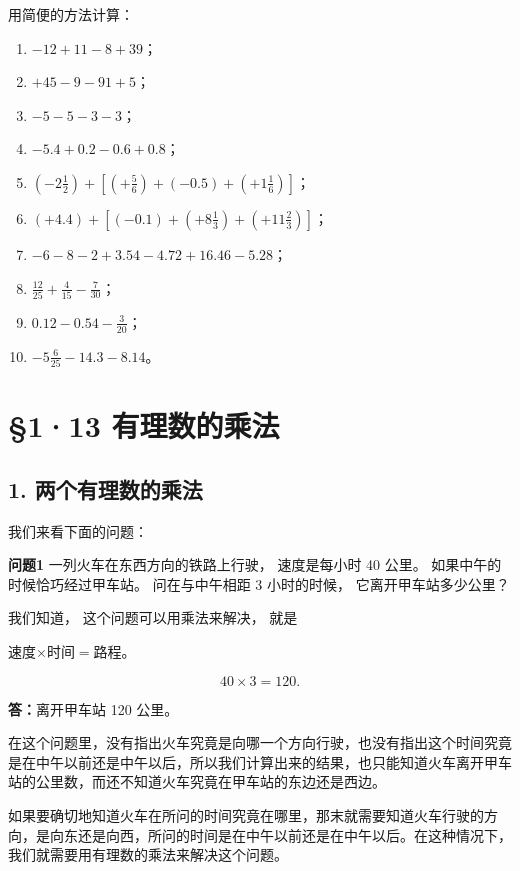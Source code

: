 用简便的方法计算：

\begin{enumerate}
\item \(-12 + 11 - 8 + 39\)；
\item \(+45 - 9 - 91 + 5\)；
\item \(-5 - 5 - 3 - 3\)；
\item \(-5.4 + 0.2 - 0.6 + 0.8\)；
\item \(\left(-2\frac{1}{2}\right) + \left[\left(+\frac{5}{6}\right) + (-0.5) + \left(+1\frac{1}{6}\right)\right]\)；
\item \((+4.4) + \left[(-0.1) + \left(+8\frac{1}{3}\right) + \left(+11\frac{2}{3}\right)\right]\)；
\item \(-6 - 8 - 2 + 3.54 - 4.72 + 16.46 - 5.28\)；
\item \(\frac{12}{25} + \frac{4}{15} - \frac{7}{30}\)；
\item \(0.12 - 0.54 - \frac{3}{20}\)；
\item \(-5\frac{6}{25} - 14.3 - 8.14\)。
\end{enumerate}

\section{§1·13 有理数的乘法}

\subsection{1. 两个有理数的乘法}

我们来看下面的问题：

\textbf{问题1} 一列火车在东西方向的铁路上行驶， 速度是每小时 40 公里。
如果中午的时候恰巧经过甲车站。 问在与中午相距 3 小时的时候，
它离开甲车站多少公里？

 我们知道， 这个问题可以用乘法来解决， 就是

速度\(\times\)时间\(=\)路程。

\[
40 \times 3 = 120. \tag {1}
\]

\textbf{答：}离开甲车站 120 公里。

在这个问题里，没有指出火车究竟是向哪一个方向行驶，也没有指出这个时间究竟是在中午以前还是中午以后，所以我们计算出来的结果，也只能知道火车离开甲车站的公里数，而还不知道火车究竟在甲车站的东边还是西边。

如果要确切地知道火车在所问的时间究竟在哪里，那末就需要知道火车行驶的方向，是向东还是向西，所问的时间是在中午以前还是在中午以后。在这种情况下，我们就需要用有理数的乘法来解决这个问题。

